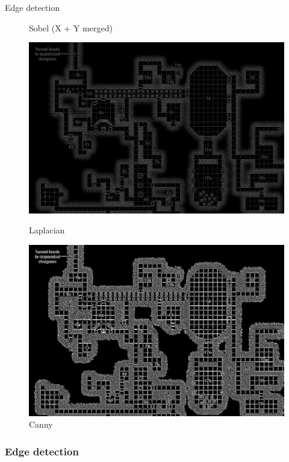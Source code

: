 \documentclass[tikz,table,border=2mm]{beamer}
\begin{document}
\begin{frame}{Edge detection}
\begin{figure}[ht]
\begin{minipage}[b]{0.35\linewidth}
            \caption{Sobel (X + Y merged)}
            \label{fig:b}
        \end{minipage}
        \begin{minipage}[b]{0.35\linewidth}
            \centering
            \includegraphics[width=\textwidth]{images/laplacian.jpg}
            \caption{Laplacian}
            \label{fig:a}
        \end{minipage}
        \hspace{0.5cm}
        \begin{minipage}[b]{0.35\linewidth}
            \centering
            \includegraphics[width=\textwidth]{images/canny.jpg}
            \caption{Canny}
            \label{fig:b}
        \end{minipage}
    \end{figure}
\end{frame}
\begin{frame}
\frametitle{Edge detection}

\end{frame}
\end{document}
